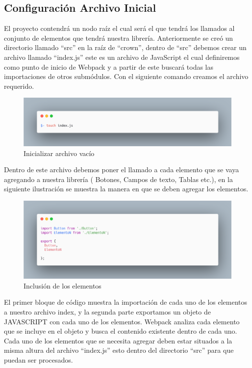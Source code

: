 \subsection{Configuración Archivo Inicial}
El proyecto contendrá un nodo raíz el cual será el que tendrá los llamados al conjunto de elementos que tendrá nuestra librería. Anteriormente se creó un directorio llamado “src” en la raíz de “crown”, dentro de “src” debemos crear un archivo llamado “index.js” este es un archivo de JavaScript el cual definiremos como punto de inicio de Webpack  y a partir de este buscará todas las importaciones de otros submódulos. Con el siguiente comando creamos el archivo requerido.
\newline
\newline
     \begin{figure}[H]
    \includegraphics[width=1\textwidth]{./Imagenes/carbon.png}
    \caption[Inicializar archivo vacío]{Inicializar archivo vacío}
    \end{figure}
\newline
\newline
Dentro de este archivo debemos poner el llamado a cada elemento que se vaya agregando a nuestra librería ( Botones, Campos de texto, Tablas etc.), en la siguiente ilustración se muestra la manera en que se deben agregar los elementos.
\newline
\newline
\begin{figure}[H]
    \includegraphics[width=1\textwidth]{./Imagenes/carbon-2.png}
    \caption[Inclusión de los elementos]{Inclusión de los elementos}
    \end{figure}
\newline
\newline
El primer bloque de código muestra la importación de cada uno de los elementos a nuestro archivo index, y la segunda parte exportamos un objeto de JAVASCRIPT con cada uno de los elementos.
Webpack analiza cada elemento que se incluye en el objeto y busca el contenido existente dentro de cada uno.
Cada uno de los elementos que se necesita agregar deben estar situados a la misma altura del archivo “index.js” esto dentro del directorio “src” para que puedan ser procesados.



